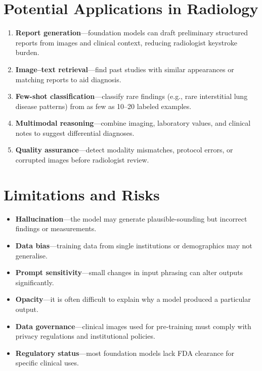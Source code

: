 \section{Potential Applications in Radiology}
\begin{enumerate}
    \item \textbf{Report generation}---foundation models can draft preliminary structured reports from images and clinical context, reducing radiologist keystroke burden.
    \item \textbf{Image--text retrieval}---find past studies with similar appearances or matching reports to aid diagnosis.
    \item \textbf{Few-shot classification}---classify rare findings (e.g., rare interstitial lung disease patterns) from as few as 10--20 labeled examples.
    \item \textbf{Multimodal reasoning}---combine imaging, laboratory values, and clinical notes to suggest differential diagnoses.
    \item \textbf{Quality assurance}---detect modality mismatches, protocol errors, or corrupted images before radiologist review.
\end{enumerate}

\section{Limitations and Risks}
\begin{itemize}
    \item \textbf{Hallucination}---the model may generate plausible-sounding but incorrect findings or measurements.
    \item \textbf{Data bias}---training data from single institutions or demographics may not generalise.
    \item \textbf{Prompt sensitivity}---small changes in input phrasing can alter outputs significantly.
    \item \textbf{Opacity}---it is often difficult to explain why a model produced a particular output.
    \item \textbf{Data governance}---clinical images used for pre-training must comply with privacy regulations and institutional policies.
    \item \textbf{Regulatory status}---most foundation models lack FDA clearance for specific clinical uses.
\end{itemize}

